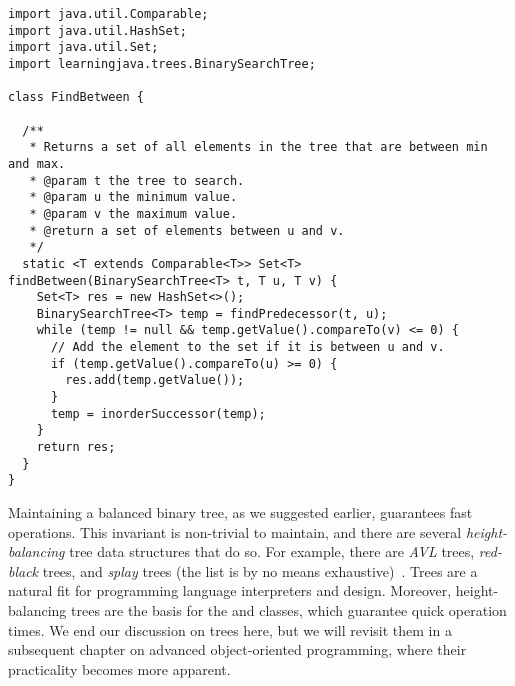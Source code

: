 \newpage
\begin{lstlisting}[language=MyJava]
import java.util.Comparable;
import java.util.HashSet;
import java.util.Set;
import learningjava.trees.BinarySearchTree;

class FindBetween {

  /**
   * Returns a set of all elements in the tree that are between min and max.
   * @param t the tree to search.
   * @param u the minimum value.
   * @param v the maximum value.
   * @return a set of elements between u and v.
   */
  static <T extends Comparable<T>> Set<T> findBetween(BinarySearchTree<T> t, T u, T v) {
    Set<T> res = new HashSet<>();
    BinarySearchTree<T> temp = findPredecessor(t, u);
    while (temp != null && temp.getValue().compareTo(v) <= 0) {
      // Add the element to the set if it is between u and v.
      if (temp.getValue().compareTo(u) >= 0) {
        res.add(temp.getValue());
      }
      temp = inorderSuccessor(temp);
    }
    return res;
  }
}
\end{lstlisting}

Maintaining a balanced binary tree, as we suggested earlier, guarantees fast operations. 
This invariant is non-trivial to maintain, and there are several \emph{height-balancing} tree data structures that do so. 
For example, there are \emph{AVL} trees, \emph{red-black} trees, and \emph{splay} trees (the list is by no means exhaustive)~. 
Trees are a natural fit for programming language interpreters and design. Moreover, height-balancing trees are the basis for the  and  classes, which guarantee quick operation times.
We end our discussion on trees here, but we will revisit them in a subsequent chapter on advanced object-oriented programming, where their practicality becomes more apparent.